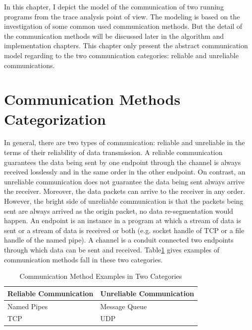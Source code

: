 
\label{chapter:mod}
In this chapter, I depict the model of the communication of two running programs from the trace analysis point of view. The modeling is based on the investigation of some common used communication methods. But the detail of the communication methods will be discussed later in the algorithm and implementation chapters. This chapter only present the abstract communication model regarding to the two communication categories: reliable and unreliable communications. 

\section{Communication Methods Categorization}
In general, there are two types of communication: reliable and unreliable in the terms of their reliability of data transmission. A reliable communication guarantees the data being sent by one endpoint through the channel is always received losslessly and in the same order in the other endpoint. On contrast, an unreliable communication does not guarantee the data being sent always arrive the receiver. Moreover, the data packets can arrive to the receiver in any order. However, the bright side of unreliable communication is that the packets being sent are always arrived as the origin packet, no data re-segmentation would happen. An endpoint is an instance in a program at which a stream of data is sent or a stream of data is received or both (e.g. socket handle of TCP or a file handle of the named pipe). A channel is a conduit connected two endpoints through  which data can be sent and received. Table\ref{methodsInCategories} gives examples of communication methods fall in these two categories.
\begin{table}[H]
\centering
\caption{Communication Method Examples in Two Categories}
\label{methodsInCategories}
\begin{tabular}{|l|l|}
 \hline
\textbf{Reliable Communication}& \textbf{Unreliable Communication}\\
 \hline
Named Pipes & Message Queue   \\
TCP &  UDP \\
 \hline
\end{tabular}
\end{table}


